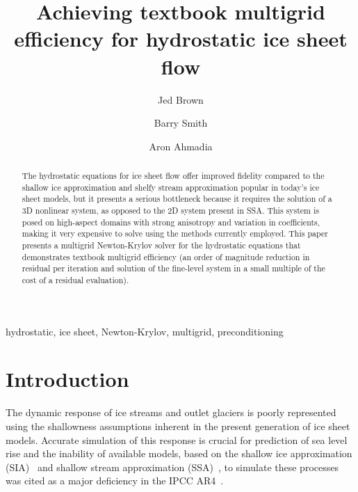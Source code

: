 \documentclass[3p]{elsarticle}
\begin{document}
\begin{frontmatter}
  \title{Achieving textbook multigrid efficiency for hydrostatic ice sheet flow}

  \author[vaw]{Jed Brown} 
  \author[mcs]{Barry Smith} 
  \author[kaust]{Aron Ahmadia} 

  \address[vaw]{Versuchsanstalt f\"ur Wasserbau, Hydrologie und Glaziologie (VAW), ETH Z\"urich, 8092     Z\"urich, Switzerland}
  \address[mcs]{Mathematics and Computer Science Division, Argonne National Laboratory, Argonne, IL     60439}
  \address[kaust]{KAUST-IBM Center for Deep Computing Research, Bldg \#1, Office 01-123,
    4700 King Abdullah University of Science and Technology,
    Thuwal Makkah 23955-6900,
    Kingdom of Saudi Arabia}

  \maketitle
  \begin{abstract}
    The hydrostatic equations for ice sheet flow offer improved fidelity compared to the shallow ice
    approximation and shelfy stream approximation popular in today's ice sheet models, but
    it presents a serious bottleneck because it requires the solution of a 3D nonlinear system, as
    opposed to the 2D system present in SSA.  This system is posed on high-aspect domains with strong
    anisotropy and variation in coefficients, making it very expensive to solve using the methods
    currently employed.  This paper presents a multigrid Newton-Krylov solver for the hydrostatic
    equations that demonstrates textbook multigrid efficiency (an order of magnitude reduction in
    residual per iteration and solution of the fine-level system in a small multiple of the cost of a
    residual evaluation).
  \end{abstract}
  \begin{keyword}
    hydrostatic, ice sheet, Newton-Krylov, multigrid, preconditioning
  \end{keyword}
  \thispagestyle{plain}
  \pagestyle{myheadings}
\end{frontmatter}

\section{Introduction}
The dynamic response of ice streams and outlet glaciers is poorly represented using the shallowness
assumptions inherent in the present generation of ice sheet models.  Accurate simulation of this
response is crucial for prediction of sea level rise and the inability of available models, based on
the shallow ice approximation (SIA)~\cite{hutter1983tgm} and shallow stream approximation
(SSA)~\cite{morland1987unconfined,weis1999theory}, to simulate these processes was cited as a major
deficiency in the IPCC AR4~\cite{ipcc2007ar4-syr}.
\end{document}
